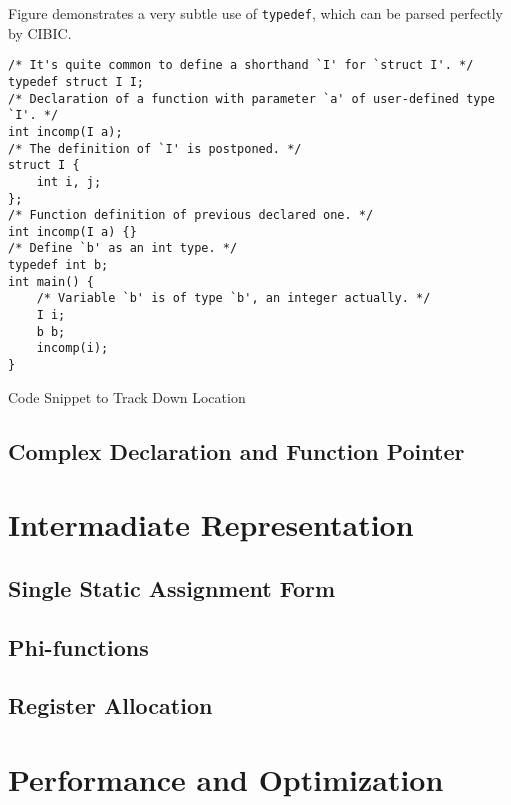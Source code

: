 \documentclass[10pt, a4paper]{article}
\begin{document}
Figure demonstrates a very subtle use of \texttt{typedef}, which can be parsed perfectly by CIBIC.

\begin{listing}[H]
    \centering
    \begin{verbatim}
/* It's quite common to define a shorthand `I' for `struct I'. */
typedef struct I I; 
/* Declaration of a function with parameter `a' of user-defined type `I'. */
int incomp(I a);
/* The definition of `I' is postponed. */
struct I { 
    int i, j;
};
/* Function definition of previous declared one. */
int incomp(I a) {}
/* Define `b' as an int type. */
typedef int b;
int main() {
    /* Variable `b' is of type `b', an integer actually. */
    I i;
    b b;
    incomp(i);
}
\end{verbatim}
\caption {Code Snippet to Track Down Location}
\end{listing}


\subsection{Complex Declaration and Function Pointer}
\section{Intermadiate Representation}
\subsection{Single Static Assignment Form}
\subsection{Phi-functions}
\subsection{Register Allocation}
\section{Performance and Optimization}
\end{document}
